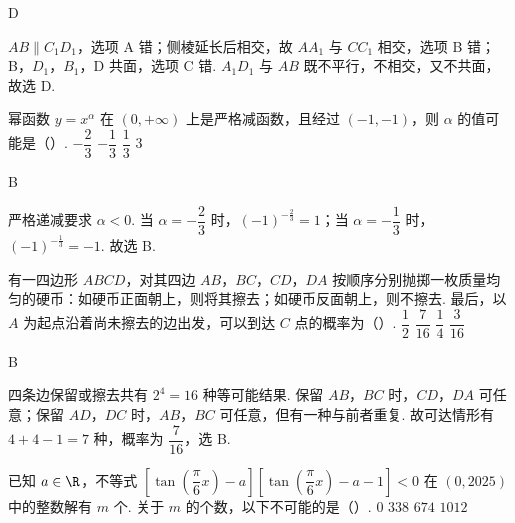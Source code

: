 \begin{answer}
D
\end{answer}

\begin{solution}
\(AB\parallel C_1D_1\)，选项 A 错；侧棱延长后相交，故 \(AA_1\) 与 \(CC_1\) 相交，选项 B 错；B，\(D_1\)，\(B_1\)，D 共面，选项 C 错. \(A_1D_1\) 与 \(AB\) 既不平行，不相交，又不共面，故选 D.
\end{solution}

\begin{problem}
幂函数 \(y=x^\alpha\) 在 \((0,+\infty)\) 上是严格减函数，且经过 \((-1,-1)\)，则 \(\alpha\) 的值可能是（\quad）.
\choices
    {\(-\dfrac23\)}
    {\(-\dfrac13\)}
    {\(\dfrac13\)}
    {\(3\)}
\end{problem}

\begin{answer}
B
\end{answer}

\begin{solution}
严格递减要求 \(\alpha<0\). 当 \(\alpha=-\dfrac23\) 时，\((-1)^{-\frac{2}{3}}=1\)；当 \(\alpha=-\dfrac13\) 时，\((-1)^{-\frac{1}{3}}=-1\). 故选 B.
\end{solution}

\begin{problem}
有一四边形 \(ABCD\)，对其四边 \(AB\)，\(BC\)，\(CD\)，\(DA\) 按顺序分别抛掷一枚质量均匀的硬币：如硬币正面朝上，则将其擦去；如硬币反面朝上，则不擦去. 最后，以 \(A\) 为起点沿着尚未擦去的边出发，可以到达 \(C\) 点的概率为（\quad）.
\choices
    {\(\dfrac12\)}
    {\(\dfrac7{16}\)}
    {\(\dfrac14\)}
    {\(\dfrac3{16}\)}
\end{problem}

\begin{answer}
B
\end{answer}

\begin{solution}
四条边保留或擦去共有 \(2^4=16\) 种等可能结果. 保留 \(AB\)，\(BC\) 时，\(CD\)，\(DA\) 可任意；保留 \(AD\)，\(DC\) 时，\(AB\)，\(BC\) 可任意，但有一种与前者重复. 故可达情形有 \(4+4-1=7\) 种，概率为 \(\dfrac7{16}\)，选 B.
\end{solution}

\begin{problem}
已知 \(a\in\R\)，不等式 \(\left[\tan\left(\dfrac\pi6x\right)-a\right]\left[\tan\left(\dfrac\pi6x\right)-a-1\right]<0\) 在 \((0,2025)\) 中的整数解有 \(m\) 个. 关于 \(m\) 的个数，以下不可能的是（\quad）.
\choices
    {\(0\)}
    {\(338\)}
    {\(674\)}
    {\(1012\)}
\end{problem}

